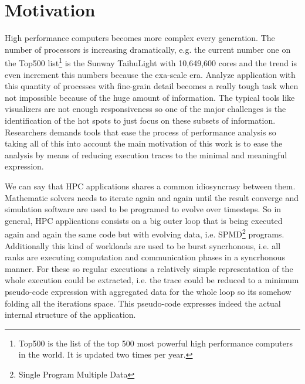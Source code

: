 \section{Motivation}

High performance computers becomes more complex every generation. The number of 
processors is increasing dramatically, e.g. the current number one on the Top500
 list\footnote{Top500 is the list of the top 500 most powerful high performance 
computers in the world. It is updated two times per year.} is the Sunway TaihuLight 
with 10,649,600 cores\cite{top500_2017} and the trend is even increment this
numbers because the exa-scale era. Analyze application with this quantity 
of processes with fine-grain detail becomes a really tough task when not
impossible because of the huge amount of information. The typical tools like 
visualizers are not enough responsiveness so one of the major challenges is the 
identification of the hot spots to just focus on these subsets of information. 
Researchers demands 
tools that ease the process of performance analysis so taking all of this into 
account the main motivation of this work is to ease the analysis by means of 
reducing execution traces to the minimal and meaningful expression.

We can say that HPC applications shares a common idiosyncrasy between them. 
Mathematic solvers needs to iterate again and again until the result converge and 
simulation software are used to be programed to evolve over timesteps. So in 
general, HPC applications consists on a big outer loop that is being executed 
again and again the same code but with evolving data, i.e. SPMD\footnote{Single
Program Multiple Data} programs. Additionally this kind of workloads are used
to be burst syncrhonous, i.e. all ranks are executing computation and
communication phases in a syncrhonous manner. For these so regular executions a
relatively simple representation of the whole execution could be extracted, i.e.
the trace could be reduced to a minimum pseudo-code expression
with aggregated data for the whole loop so its somehow folding all the iterations
space. This pseudo-code expresses indeed the actual internal structure of the 
application.


